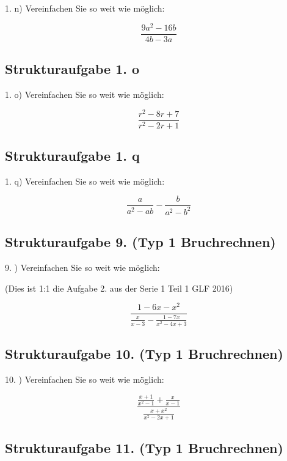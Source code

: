 1. n) Vereinfachen Sie so weit wie möglich:

$$\frac{9a^2-16b}{4b-3a}$$


\subsection*{Strukturaufgabe 1. o}

1. o) Vereinfachen Sie so weit wie möglich:

$$\frac{r^2-8r+7}{r^2-2r+1}$$


\subsection*{Strukturaufgabe 1. q}

1. q) Vereinfachen Sie so weit wie möglich:

$$\frac{a}{a^2-ab} - \frac{b}{a^2-b^2}$$


\subsection*{Strukturaufgabe 9. (Typ 1 Bruchrechnen)}

9. ) Vereinfachen Sie so weit wie möglich:

(Dies ist 1:1 die Aufgabe 2. aus der Serie 1 Teil 1 GLF 2016)

$$\frac{1-6x-x^2}{\frac{x}{x-3} - \frac{1-7x}{x^2-4x+3}}$$



\subsection*{Strukturaufgabe 10. (Typ 1 Bruchrechnen)}

10. ) Vereinfachen Sie so weit wie möglich:

$$\frac{\frac{x+1}{x^2-1} + \frac{x}{x-1}}{\frac{x+x^2}{x^2-2x+1}}$$


\subsection*{Strukturaufgabe 11. (Typ 1 Bruchrechnen)}

